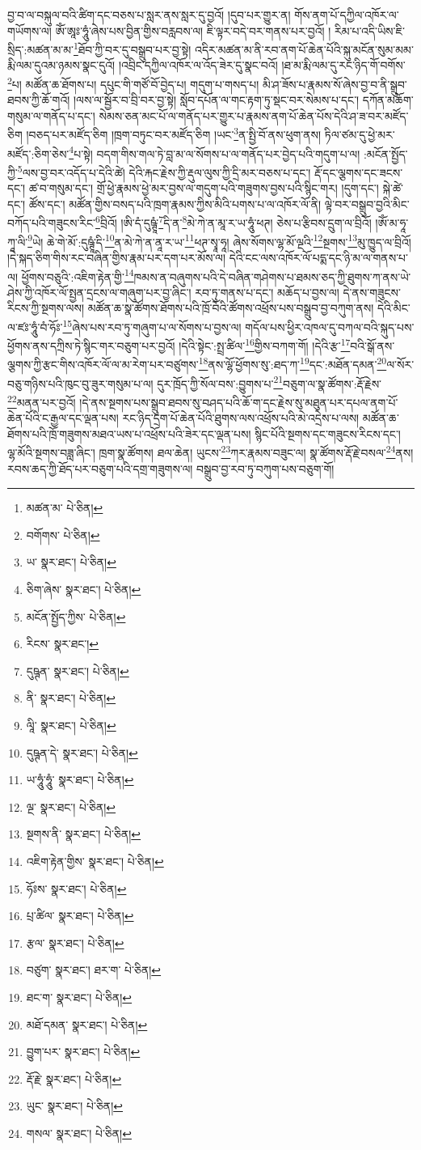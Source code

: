 བྱ་བ་ལ་བསྐུལ་བའི་ཚིག་དང་བཅས་པ་སླར་ནས་སླར་དུ་བྱའོ། །དུབ་པར་གྱུར་ན། གོས་ནག་པོ་དཀྱིལ་འཁོར་ལ་གཡོགས་ལ། ཨོཾ་ཨཱཿ་ཧཱུཾ་ཞེས་པས་བྱིན་གྱིས་བརླབས་ལ། ཇི་ལྟར་བདེ་བར་གནས་པར་བྱའོ། །
རིམ་པ་འདི་ཡིས་ཇི་སྲིད་:མཚན་མ་མ་\footnote{མཚན་མ་  པེ་ཅིན། }ཐོབ་ཀྱི་བར་དུ་བསྒྲུབ་པར་བྱ་སྟེ། འདིར་མཚན་མ་ནི་རབ་ནག་པོ་ཆེན་པོའི་སྐུ་མངོན་སུམ་མམ་རྨི་ལམ་དུའམ་ཉམས་སྣང་དུའོ། །འབྲིང་དཀྱིལ་འཁོར་ལ་འོད་ཟེར་དུ་སྣང་བའོ། །ཐ་མ་རྨི་ལམ་དུ་རང་ཉིད་གོ་བགོས་\footnote{བགོགས་  པེ་ཅིན། }པ། མཚོན་ཆ་ཐོགས་པ། དཔུང་གི་གཙོ་བོ་བྱེད་པ། གདུག་པ་གསད་པ། མི་ཤ་ཟོས་པ་རྣམས་སོ་ཞེས་བྱ་བ་ནི་སྒྲུབ་ཐབས་ཀྱི་ཆོ་གའོ། །ལས་ལ་སྦྱོར་བ་བྲི་བར་བྱ་སྟེ། སློབ་དཔོན་ལ་གང་རྟག་ཏུ་སྡང་བར་སེམས་པ་དང་། དཀོན་མཆོག་གསུམ་ལ་གནོད་པ་དང་། སེམས་ཅན་མང་པོ་ལ་གནོད་པར་གྱུར་པ་རྣམས་ནག་པོ་ཆེན་པོས་དེའི་ཤ་ཟ་བར་མཛོད་ཅིག །བཅད་པར་མཛོད་ཅིག །ཁྲག་བཏུང་བར་མཛོད་ཅིག །ཡང་\footnote{ཡ་  སྣར་ཐང་།  པེ་ཅིན། }ན་སྤྱི་བོ་ནས་ཕུག་ནས། ཏིལ་ཙམ་དུ་ཕྱེ་མར་མཛོད་:ཅིག་ཅེས་\footnote{ཅིག་ཞེས་  སྣར་ཐང་།  པེ་ཅིན། }པ་སྟེ། བདག་གིས་གལ་ཏེ་བླ་མ་ལ་སོགས་པ་ལ་གནོད་པར་བྱེད་པའི་གདུག་པ་ལ། :མངོན་སྤྱོད་ཀྱི་\footnote{མངོན་སྤྱོད་ཀྱིས་  པེ་ཅིན། }ལས་བྱ་བར་འདོད་པ་དེའི་ཚེ། དེའི་རྐང་རྗེས་ཀྱི་རྡུལ་ལུས་ཀྱི་དྲི་མར་བཅས་པ་དང་། རྡོ་དང་ལྕགས་དང་ཟངས་དང་། ཚ་བ་གསུམ་དང་། གྲོ་ཕྱེ་རྣམས་ཕྱེ་མར་བྱས་ལ་གདུག་པའི་གཟུགས་བྱས་པའི་སྙིང་གར། །དུག་དང་། སྐེ་ཚེ་དང་། ཚོས་དང་། མཚོན་གྱིས་བསད་པའི་ཁྲག་རྣམས་ཀྱིས་མིའི་པགས་པ་ལ་འཁོར་ལོ་ནི། ལྟེ་བར་བསྒྲུབ་བྱའི་མིང་བཀོད་པའི་གཟུངས་རིང་\footnote{རིངས་  སྣར་ཐང་། }བྲིའོ། །ཨི་དཾ་དུཥྚཱཾ་\footnote{དུཥྚན་  སྣར་ཐང་།  པེ་ཅིན། }དི་ན་\footnote{ནི་  སྣར་ཐང་།  པེ་ཅིན། }མེ་ཀེ་ན་མཱ་ར་ཡ་ཧཱུཾ་ཕཊ། ཅེས་པ་རྩིབས་དྲུག་ལ་བྲིའོ། །ཨོཾ་མ་ཧཱ་ཀཱ་ལི་\footnote{ལཱི་  སྣར་ཐང་།  པེ་ཅིན། }ཡེ། ཆེ་གེ་མོ་:དུཥྚཱཾ་དི་\footnote{དུཥྚན་དེ་  སྣར་ཐང་།  པེ་ཅིན། }ན་མེ་ཀེ་ན་ནཱ་ར་ཡ་\footnote{ཡ་ཧཱུཾ་ཧཱུཾ་  སྣར་ཐང་།  པེ་ཅིན། }ཕཊ་སྭཱ་ཧཱ། ཞེས་སོགས་ལྷ་མོ་ལྔའི་\footnote{ལྔ་  སྣར་ཐང་།  པེ་ཅིན། }སྔགས་\footnote{སྔགས་ནི་  སྣར་ཐང་།  པེ་ཅིན། }མུ་ཁྱུད་ལ་བྲིའོ། །དེ་སྐད་ཅིག་གིས་རང་བཞིན་གྱིས་རྣམ་པར་དག་པར་མོས་ལ། དེའི་ངང་ལས་འཁོར་ལོ་པདྨ་དང་ཉི་མ་ལ་གནས་པ་ལ། ཕྱོགས་བཅུའི་:འཇིག་རྟེན་གྱི་\footnote{འཇིག་རྟེན་གྱིས་  སྣར་ཐང་།  པེ་ཅིན། }ཁམས་ན་བཞུགས་པའི་དེ་བཞིན་གཤེགས་པ་ཐམས་ཅད་ཀྱི་ཐུགས་ཀ་ནས་ཡེ་ཤེས་ཀྱི་འཁོར་ལོ་སྤྱན་དྲངས་ལ་གཞུག་པར་བྱ་ཞིང་། རབ་ཏུ་གནས་པ་དང་། མཆོད་པ་བྱས་ལ། དེ་ནས་གཟུངས་རིངས་ཀྱི་སྔགས་ལས། མཚོན་ཆ་སྣ་ཚོགས་ཐོགས་པའི་ཁྲོ་བོའི་ཚོགས་འཕྲོས་པས་བསྒྲུབ་བྱ་བཀུག་ནས། དེའི་མིང་ལ་ཛཿ་ཧཱུཾ་བཾ་ཧོཿ་\footnote{ཧོཿས་  སྣར་ཐང་།  པེ་ཅིན། }ཞེས་པས་རབ་ཏུ་གཞུག་པ་ལ་སོགས་པ་བྱས་ལ། གདོལ་པས་ཕྱིར་འཁལ་དུ་བཀལ་བའི་སྐུད་པས་ཕྱོགས་ནས་དཀྲིས་ཏེ་སྙིང་གར་བཅུག་པར་བྱའོ། །དེའི་སྟེང་:སྤྲ་ཚིལ་\footnote{པྲ་ཚིལ་  སྣར་ཐང་།  པེ་ཅིན། }གྱིས་བཀག་གོ། །དེའི་རྩ་\footnote{རྩལ་  སྣར་ཐང་།  པེ་ཅིན། }བའི་སྒོ་ནས་ལྕགས་ཀྱི་རྩང་གིས་འཁོར་ལོ་ལ་མ་རེག་པར་བཙུགས་\footnote{བཙུག་  སྣར་ཐང་། ཐར་ག་  པེ་ཅིན། }ནས་ལྷོ་ཕྱོགས་སུ་:ཐད་ཀ་\footnote{ཐང་ག་  སྣར་ཐང་།  པེ་ཅིན། }དང་:མཐོན་དམན་\footnote{མཐོ་དམན་  སྣར་ཐང་།  པེ་ཅིན། }ལ་སོར་བཅུ་གཉིས་པའི་ཁུང་བུ་ཟུར་གསུམ་པ་ལ། དུར་ཁྲོད་ཀྱི་སོལ་བས་:བྱུགས་པ་\footnote{བྱུག་པར་  སྣར་ཐང་།  པེ་ཅིན། }བཅུག་ལ་སྣ་ཚོགས་:རྡོ་རྗེས་\footnote{རྡོ་རྗེ་  སྣར་ཐང་།  པེ་ཅིན། }མནན་པར་བྱའོ། །དེ་ནས་སྔགས་པས་སྒྲུབ་ཐབས་སུ་བཤད་པའི་ཆོ་ག་དང་རྗེས་སུ་མཐུན་པར་དཔལ་ནག་པོ་ཆེན་པོའི་ང་རྒྱལ་དང་ལྡན་པས། རང་ཉིད་དྲག་པོ་ཆེན་པོའི་ཐུགས་ལས་འཕྲོས་པའི་མེ་འདྲེས་པ་ལས། མཚོན་ཆ་ཐོགས་པའི་ཁྲོ་གཟུགས་མཐའ་ཡས་པ་འཕྲོས་པའི་ཟེར་དང་ལྡན་པས། སྙིང་པོའི་སྔགས་དང་གཟུངས་རིངས་དང་། ལྷ་མོའི་སྔགས་བཟླ་ཞིང་། ཁྲག་སྣ་ཚོགས། ཐལ་ཆེན། ཡུངས་\footnote{ཡུང་  སྣར་ཐང་།  པེ་ཅིན། }ཀར་རྣམས་བཟུང་ལ། སྣ་ཚོགས་རྡོ་རྗེ་བསལ་\footnote{གསལ་  སྣར་ཐང་།  པེ་ཅིན། }ནས། རབས་ཆད་ཀྱི་ཐོད་པར་བཅུག་པའི་དགྲ་གཟུགས་ལ། བསྒྲུབ་བྱ་རབ་ཏུ་བཀུག་པས་བཅུག་གོ། 